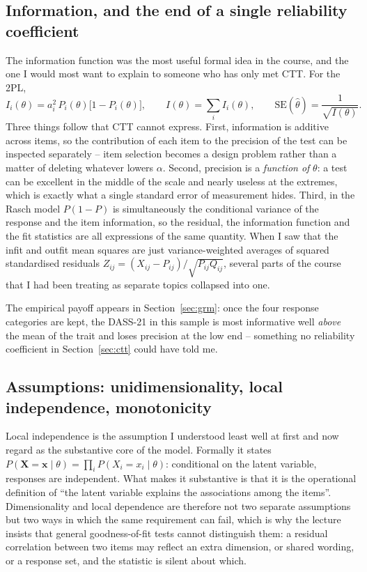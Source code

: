 \documentclass[11pt,a4paper]{article}
\begin{document}
\subsection{Information, and the end of a single reliability coefficient}

The information function was the most useful formal idea in the course, and the
one I would most want to explain to someone who has only met CTT. For the 2PL,
\begin{equation}
I_i(\theta)=a_i^2\,P_i(\theta)\bigl[1-P_i(\theta)\bigr],
\qquad
I(\theta)=\sum_i I_i(\theta),
\qquad
\mathrm{SE}(\hat\theta)=\frac{1}{\sqrt{I(\theta)}} .
\end{equation}
Three things follow that CTT cannot express. First, information is additive across
items, so the contribution of each item to the precision of the test can be
inspected separately -- item selection becomes a design problem rather than a
matter of deleting whatever lowers $\alpha$. Second, precision is a
\emph{function of} $\theta$: a test can be excellent in the middle of the scale
and nearly useless at the extremes, which is exactly what a single standard error
of measurement hides. Third, in the Rasch model $P(1-P)$ is simultaneously the
conditional variance of the response and the item information, so the residual,
the information function and the fit statistics are all expressions of the same
quantity. When I saw that the infit and outfit mean squares are just
variance-weighted averages of squared standardised residuals $Z_{ij} =
(X_{ij}-P_{ij})/\sqrt{P_{ij}Q_{ij}}$, several parts of the course that I had been
treating as separate topics collapsed into one.

The empirical payoff appears in Section~\ref{sec:grm}: once the four response
categories are kept, the DASS-21 in this sample is most informative well \emph{above}
the mean of the trait and loses precision at the low end -- something no reliability
coefficient in Section~\ref{sec:ctt} could have told me.

\subsection{Assumptions: unidimensionality, local independence, monotonicity}

Local independence is the assumption I understood least well at first and now
regard as the substantive core of the model. Formally it states
$P(\mathbf{X}=\mathbf{x}\mid\theta)=\prod_i P(X_i=x_i\mid\theta)$: conditional on
the latent variable, responses are independent. What makes it substantive is that
it is the operational definition of ``the latent variable explains the
associations among the items''. Dimensionality and local dependence are therefore
not two separate assumptions but two ways in which the same requirement can fail,
which is why the lecture insists that general goodness-of-fit tests cannot
distinguish them: a residual correlation between two items may reflect an extra
dimension, or shared wording, or a response set, and the statistic is silent about
which.
\end{document}
